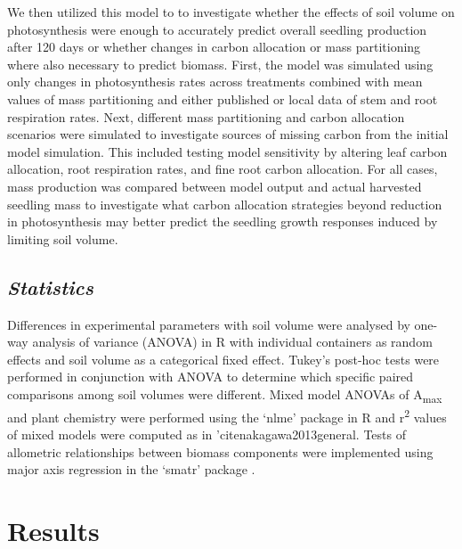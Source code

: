 \documentclass[a4paper]{article}\usepackage[]{graphicx}\usepackage[]{color}
\begin{document}
We then utilized this model to to investigate whether the effects of soil volume on photosynthesis were enough to accurately predict overall seedling production after 120 days or whether changes in carbon allocation or mass partitioning where also necessary to predict biomass. First, the model was simulated using only changes in photosynthesis rates across treatments combined with mean values of mass partitioning and either published or local data of stem and root respiration rates. Next, different mass partitioning and carbon allocation scenarios were simulated to investigate sources of missing carbon from the initial model simulation. This included testing model sensitivity by altering leaf carbon allocation, root respiration rates, and fine root carbon allocation. For all cases, mass production was compared between model output and actual harvested seedling mass to investigate what carbon allocation strategies beyond reduction in photosynthesis may better predict the seedling growth responses induced by limiting soil volume. 

\subsection*{\textit{Statistics}}
Differences in experimental parameters with soil volume were analysed by one-way analysis of variance (ANOVA) in R with individual containers as random effects and soil volume as a categorical fixed effect. Tukey’s post-hoc tests were performed in conjunction with ANOVA to determine which specific paired comparisons among soil volumes were different. Mixed model ANOVAs of A\textsubscript{max} and plant chemistry were performed using the ‘nlme’ package \cite{nlme} in R and r\textsuperscript{2} values of mixed models were computed as in 'cite{nakagawa2013general}. Tests of allometric relationships between biomass components were implemented using major axis regression in the ‘smatr’ package \cite{warton2012smatr}.

\section*{Results}
\end{document}
